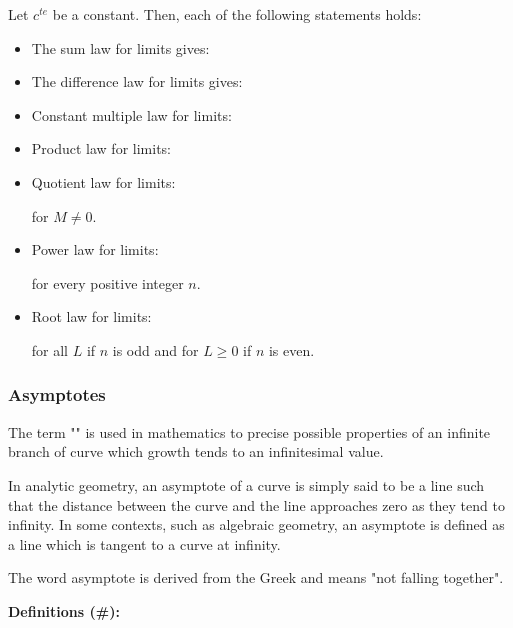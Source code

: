 	Let $c^{te}$ be a constant. Then, each of the following statements holds:		
	\begin{itemize}
		\item The sum law for limits gives:
		
		
		\item The difference law for limits gives:
		
		
		\item Constant multiple law for limits:
		
		
		\item Product law for limits:
		
		
		\item Quotient law for limits:
		
		for $M\neq 0$.
		
		\item Power law for limits:
		
		for every positive integer $n$.
		
		\item Root law for limits:
		
		for all $L$ if $n$ is odd and for $L\geq 0$ if $n$ is even.
	\end{itemize}
	
	\subsubsection{Asymptotes}
	The term "" is used in mathematics to precise possible properties of an infinite branch of curve which growth tends to an infinitesimal value.
	
	In analytic geometry, an asymptote of a curve is simply said to be a line such that the distance between the curve and the line approaches zero as they tend to infinity. In some contexts, such as algebraic geometry, an asymptote is defined as a line which is tangent to a curve at infinity.
	\begin{tcolorbox}[title=Remark,colframe=black,arc=10pt]
	The word asymptote is derived from the Greek and means "not falling together".
	\end{tcolorbox}	
	
	\textbf{Definitions (\#\mydef):}
	
